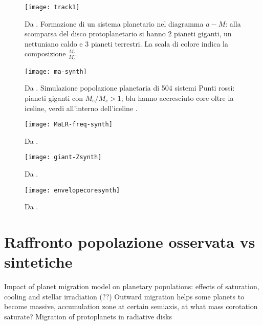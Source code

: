 \begin{figure}
\texttt{[image: track1]}
\caption{Da \cite{mordasini2018planetary}. Formazione di un sistema planetario nel diagramma $a-M$: alla scomparsa del disco protoplanetario si hanno 2 pianeti giganti, un nettuniano caldo e 3 pianeti terrestri. La scala di colore indica la composizione $\frac{M_e}{M_c}$.}\label{fig:track1}
\end{figure}

\begin{figure}
\texttt{[image: ma-synth]}
\caption{Da \cite{mordasini2018planetary}. Simulazione popolazione planetaria di 504 sistemi Punti rossi: pianeti giganti con $M_e/M_c>1$; blu hanno accresciuto core oltre la iceline, verdi all'interno dell'iceline .}
\end{figure}

\begin{figure}
\texttt{[image: MaLR-freq-synth]}
\caption{Da \cite{mordasini2018planetary}. }
\end{figure}

\begin{figure}
\texttt{[image: giant-Zsynth]}
\caption{Da \cite{mordasini2018planetary}. }
\end{figure}

\begin{figure}
\texttt{[image: envelopecoresynth]}
\caption{Da \cite{mordasini2018planetary}. }
\end{figure}

{\let\clearpage\relax\let\cleardoublepage\relax
\chapter{Raffronto popolazione osservata vs sintetiche}
}

\begin{workout}
Impact of planet migration model on planetary populations: effects of saturation, cooling and stellar irradiation (??)
Outward migration helps some planets to become massive, accumulation zone at certain semiaxis, at what mass corotation saturate?
Migration of protoplanets in radiative disks
\end{workout}
